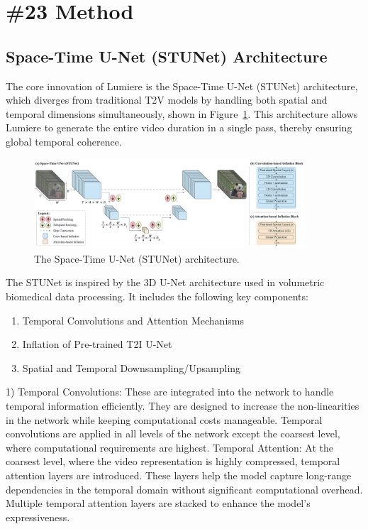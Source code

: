 \documentclass[conference]{IEEEtran}
\theoremstyle{definition}
\theoremstyle{plain}
\theoremstyle{remark}
\begin{document}
\section{\textbf{\#23} Method}
\subsection{Space-Time U-Net (STUNet) Architecture}
The core innovation of Lumiere is the Space-Time U-Net (STUNet) architecture, which diverges from traditional T2V models by handling both spatial and temporal dimensions simultaneously, shown in Figure~\ref{fig:STUNet-architecture}.
This architecture allows Lumiere to generate the entire video duration in a single pass, thereby ensuring global temporal coherence.
\begin{figure}[!htbp]
    \centering
    \includegraphics[width=0.9\textwidth]{STUNet-architecture.png}
    \caption{The Space-Time U-Net (STUNet) architecture.}
    \label{fig:STUNet-architecture}
\end{figure}

The STUNet is inspired by the 3D U-Net architecture used in volumetric biomedical data processing. It includes the following key components:
\begin{enumerate}
    \item Temporal Convolutions and Attention Mechanisms
    \item Inflation of Pre-trained T2I U-Net
    \item Spatial and Temporal Downsampling/Upsampling
\end{enumerate}

1)
Temporal Convolutions: These are integrated into the network to handle temporal information efficiently. They are designed to increase the non-linearities in the network while keeping computational costs manageable. Temporal convolutions are applied in all levels of the network except the coarsest level, where computational requirements are highest.
Temporal Attention: At the coarsest level, where the video representation is highly compressed, temporal attention layers are introduced. These layers help the model capture long-range dependencies in the temporal domain without significant computational overhead. Multiple temporal attention layers are stacked to enhance the model's expressiveness.
\end{document}
